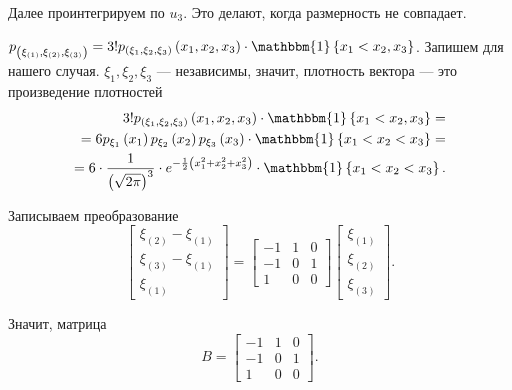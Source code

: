 \begin{enumerate}[label=\alph*)]
Далее проинтегрируем по $u_3$.
Это делают, когда размерность не совпадает.

$p_{ \left( \xi_{ \left( 1 \right) }, \xi_{ \left( 2 \right) }, \xi_{ \left( 3 \right) } \right) } =
  3! p_{ \left( \xi_1, \xi_2, \xi_3 \right) } \left( x_1, x_2, x_3 \right) \cdot
  \mathbbm{1} \left\{ x_1 < x_2 , x_3 \right\} $.
Запишем для нашего случая.
$ \xi_1, \xi_2, \xi_3$ --- независимы, значит, плотность вектора --- это произведение плотностей
\begin{equation*}
  \begin{split}
    3! p_{ \left( \xi_1, \xi_2, \xi_3 \right) } \left( x_1, x_2, x_3 \right) \cdot
    \mathbbm{1} \left\{ x_1 < x_2 , x_3 \right\} = \\
    = 6p_{ \xi_1} \left( x_1 \right) p_{ \xi_2} \left( x_2 \right) p_{ \xi_3} \left( x_3 \right) \cdot
    \mathbbm{1} \left\{ x_1 < x_2 < x_3 \right\} = \\
    = 6 \cdot \frac{1}{ \left( \sqrt{2 \pi } \right)^3} \cdot
    e^{- \frac{1}{2} \left( x_1^2 + x_2^2 + x_3^2 \right) } \cdot
    \mathbbm{1} \left\{ x_1 < x_2 < x_3 \right\}.
  \end{split}
\end{equation*}

Записываем преобразование
$$ \begin{bmatrix}
    \xi_{ \left( 2 \right) } - \xi_{ \left( 1 \right) } \\
    \xi_{ \left( 3 \right) } - \xi_{ \left( 1 \right) } \\
    \xi_{ \left( 1 \right) }
  \end{bmatrix} =
  \begin{bmatrix}
    -1 & 1 & 0 \\
    -1 & 0 & 1 \\
    1 & 0 & 0
  \end{bmatrix}
  \begin{bmatrix}
    \xi_{ \left( 1 \right) } \\
    \xi_{ \left( 2 \right) } \\
    \xi_{ \left( 3 \right) }
  \end{bmatrix}.$$

  Значит, матрица
  $$B =
  \begin{bmatrix}
    -1 & 1 & 0 \\
    -1 & 0 & 1 \\
    1 & 0 & 0
  \end{bmatrix}.$$


\end{enumerate}
